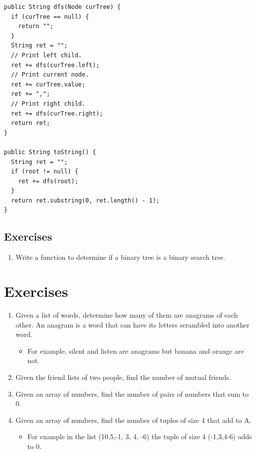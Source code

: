 \documentclass[11pt,oneside]{book}
\begin{document}
\begin{lstlisting}
public String dfs(Node curTree) {
  if (curTree == null) {
    return "";
  }
  String ret = "";
  // Print left child.
  ret += dfs(curTree.left);
  // Print current node.
  ret += curTree.value;
  ret += ",";
  // Print right child.
  ret += dfs(curTree.right);
  return ret;
}
    
public String toString() {
  String ret = "";
  if (root != null) {
    ret += dfs(root);
  }
  return ret.substring(0, ret.length() - 1);
}
\end{lstlisting}

\subsection{Exercises}

\begin{enumerate}
\item Write a function to determine if a binary tree is a binary search tree.
\end{enumerate}

        \section{ Exercises }
        

\begin{enumerate}
\item Given a list of words, determine how many of them are anagrams of each other. An anagram is a word that can have its letters scrambled into another word. 

\begin{itemize}
\item For example, silent and listen are anagrams but banana and orange are not.
\end{itemize}
\item Given the friend lists of two people, find the number of mutual friends.
\item Given an array of numbers, find the number of pairs of numbers that sum to 0.
\item Given an array of numbers, find the number of tuples of size 4 that add to A.

\begin{itemize}
\item For example in the list (10,5,-1, 3, 4, -6) the tuple of size 4 (-1,3,4-6) adds to 0.
\end{itemize}
\end{enumerate}
\end{document}
